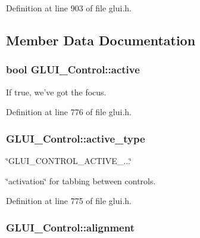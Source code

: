 Definition at line 903 of file glui.\+h.



\subsection{Member Data Documentation}
\hypertarget{class_g_l_u_i___control_ad285387e771b46fb294935f68e967a77}{
\subsubsection[{active}]{\setlength{\rightskip}{0pt plus 5cm}bool G\+L\+U\+I\+\_\+\+Control\+::active}}\label{class_g_l_u_i___control_ad285387e771b46fb294935f68e967a77}


If true, we've got the focus. 



Definition at line 776 of file glui.\+h.

\hypertarget{class_g_l_u_i___control_ab9864db034526ddd5bbff94a5fb3ee9b}{
\subsubsection[{active\+\_\+type}]{ G\+L\+U\+I\+\_\+\+Control\+::active\+\_\+type}}\label{class_g_l_u_i___control_ab9864db034526ddd5bbff94a5fb3ee9b}


\char`\"{}\+G\+L\+U\+I\+\_\+\+C\+O\+N\+T\+R\+O\+L\+\_\+\+A\+C\+T\+I\+V\+E\+\_\+...\char`\"{} 

\char`\"{}activation\char`\"{} for tabbing between controls. 

Definition at line 775 of file glui.\+h.

\hypertarget{class_g_l_u_i___control_a5d352c36d6bad2a1eaf9795bba00b7e7}{
\subsubsection[{alignment}]{ G\+L\+U\+I\+\_\+\+Control\+::alignment}}\label{class_g_l_u_i___control_a5d352c36d6bad2a1eaf9795bba00b7e7}


